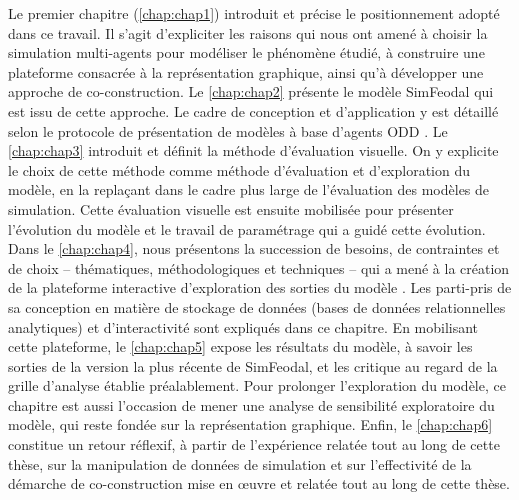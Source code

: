 Le premier chapitre (\cref{chap:chap1}) introduit et précise le positionnement adopté dans ce travail.
Il s'agit d'expliciter les raisons qui nous ont amené à choisir la simulation multi-agents pour modéliser le phénomène étudié, à construire une plateforme consacrée à la représentation graphique, ainsi qu'à développer une approche de co-construction.
Le \cref{chap:chap2} présente le modèle \og SimFeodal\fg{} qui est issu de cette approche. Le cadre de conception et d'application y est détaillé selon le protocole de présentation de modèles à base d'agents \og ODD\fg{} \autocite{grimm_odd_2010}.
Le \cref{chap:chap3} introduit et définit la méthode d'\og{}évaluation visuelle\fg{}.
On y explicite le choix de cette méthode comme méthode d'évaluation et d'exploration du modèle, en la replaçant dans le cadre plus large de l'évaluation des modèles de simulation.
Cette évaluation visuelle est ensuite mobilisée pour présenter l'évolution du modèle et le travail de \og paramétrage\fg{} qui a guidé cette évolution.
Dans le \cref{chap:chap4}, nous présentons la succession de besoins, de contraintes et de choix -- thématiques, méthodologiques et techniques -- qui a mené à la création de la plateforme interactive d'exploration des sorties du modèle \simedb{}.
Les parti-pris de sa conception en matière de stockage de données (bases de données relationnelles analytiques) et d'interactivité sont expliqués dans ce chapitre.
En mobilisant cette plateforme, le \cref{chap:chap5} expose les résultats du modèle, à savoir les sorties de la version la plus récente de SimFeodal, et les critique au regard de la grille d'analyse établie préalablement.
Pour prolonger l'exploration du modèle, ce chapitre est aussi l'occasion de mener une analyse de sensibilité exploratoire du modèle, qui reste fondée sur la représentation graphique.
Enfin, le \cref{chap:chap6} constitue un retour réflexif, à partir de l'expérience relatée tout au long de cette thèse, sur la manipulation de données de simulation et sur l'effectivité de la démarche de co-construction mise en œuvre et relatée tout au long de cette thèse.


\clearpage
\FancyChapter
